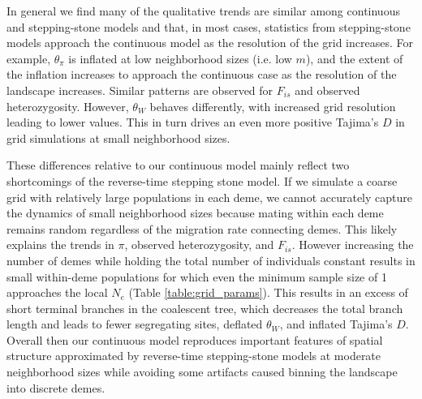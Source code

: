 \documentclass[10pt,twoside,lineno,hidelinks]{preprint}
\begin{document}
In general we find many of the qualitative trends are similar among continuous and stepping-stone models and that, in most cases, statistics from stepping-stone models approach the continuous model as the resolution of the grid increases. For example, $\theta_\pi$ is inflated at low neighborhood sizes (i.e. low $m$), and the extent of the inflation increases to approach the continuous case as the resolution of the landscape increases. Similar patterns are observed for $F_{is}$ and observed heterozygosity. However, $\theta_{W}$ behaves differently, with increased grid resolution leading to lower values. This in turn drives an even more positive Tajima's $D$ in grid simulations at small neighborhood sizes.

These differences relative to our continuous model mainly reflect two shortcomings of the reverse-time stepping stone model. If we simulate a coarse grid with relatively large populations in each deme, we cannot accurately capture the dynamics of small neighborhood sizes because mating within each deme remains random regardless of the migration rate connecting demes. This likely explains the trends in $\pi$, observed heterozygosity, and $F_{is}$. However increasing the number of demes while holding the total number of individuals constant results in small within-deme populations for which even the minimum sample size of 1 approaches the local $N_e$ (Table \ref{table:grid_params}). This results in an excess of short terminal branches in the coalescent tree, which decreases the total branch length and leads to fewer segregating sites, deflated $\theta_W$, and inflated Tajima's $D$. Overall then our continuous model reproduces important features of spatial structure approximated by reverse-time stepping-stone models at moderate neighborhood sizes while avoiding some artifacts caused binning the landscape into discrete demes. 

\end{document}
